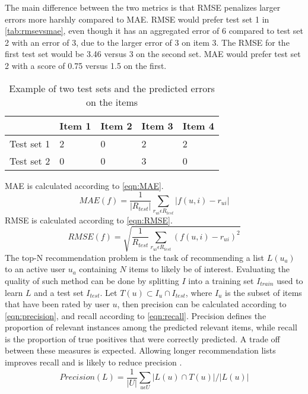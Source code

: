 The main difference between the two metrics is that RMSE penalizes larger errors more harshly compared to MAE.
RMSE would prefer test set 1 in \autoref{tab:rmsevsmae}, even though it has an aggregated error of 6 compared to test set 2 with an error of 3, due to the larger error of 3 on item 3.
The RMSE for the first test set would be 3.46 versus 3 on the second set.
MAE would prefer test set 2 with a score of 0.75 versus 1.5 on the first.
\begin{table}[]
    \begin{tabular}{|l|l|l|l|l|}
    \hline
               & Item 1 & Item 2 & Item 3 & Item 4 \\ \hline
    Test set 1 & 2      & 0      & 2      & 2      \\ \hline
    Test set 2 & 0      & 0      & 3      & 0      \\ \hline
    \end{tabular}
    \caption{Example of two test sets and the predicted errors on the items}
    \label{tab:rmsevsmae}
\end{table}
MAE is calculated according to \autoref{eqn:MAE}.
\begin{equation}
    \label{eqn:MAE}
    MAE(f) = \frac{1}{|R_{test}|} \sum\limits_{r_{ui} \epsilon R_{test}} |f(u,i)-r_{ui}|
\end{equation}
RMSE is calculated according to \autoref{eqn:RMSE}.
\begin{equation}
    \label{eqn:RMSE}
    RMSE(f) = \sqrt{\frac{1}{R_{test}} \sum\limits_{r_{ui} \epsilon R_{test}} (f(u, i) - r_{ui})^2}
\end{equation}
The top-N recommendation problem is the task of recommending a list $L(u_a)$ to an active user $u_a$ containing $N$ items to likely be of interest.
Evaluating the quality of such method can be done by splitting $I$ into a training set $I_{train}$ used to learn $L$ and a test set $I_{test}$.
Let $T(u) \subset I_u \cap I_{test}$, where $I_u$ is the subset of items that have been rated by user $u$, then precision can be calculated according to \autoref{eqn:precision}, and recall according to \autoref{eqn:recall}.
Precision defines the proportion of relevant instances among the predicted relevant items, while recall is the proportion of true positives that were correctly predicted.
A trade off between these measures is expected.
Allowing longer recommendation lists improves recall and is likely to reduce precision \cite{RecommenderHandbook2015}.
\begin{equation}
    \label{eqn:precision}
    Precision(L) = \frac{1}{|U|} \sum\limits_{u \epsilon U} |L(u) \cap T(u)| / |L(u)|
\end{equation}
